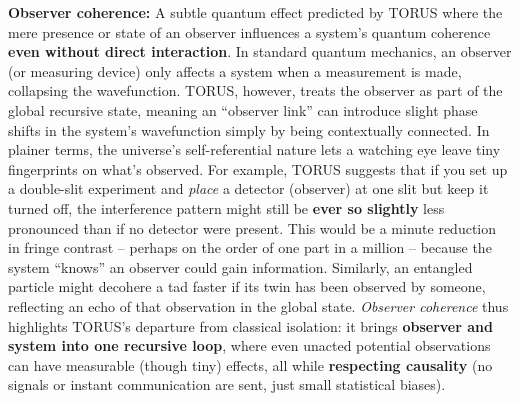 \documentclass[
]{article}
\begin{document}
{\textbf{Observer coherence:} A subtle quantum effect predicted by TORUS
where the mere presence or state of an observer influences a system's
quantum coherence \textbf{even without direct interaction}\hspace{0pt}.
In standard quantum mechanics, an observer (or measuring device) only
affects a system when a measurement is made, collapsing the
wavefunction. TORUS, however, treats the observer as part of the global
recursive state, meaning an ``observer link'' can introduce slight phase
shifts in the system's wavefunction simply by being contextually
connected\hspace{0pt}. In plainer terms, the universe's self-referential
nature lets a watching eye leave tiny fingerprints on what's observed.
For example, TORUS suggests that if you set up a double-slit experiment
and \emph{place} a detector (observer) at one slit but keep it turned
off, the interference pattern might still be \textbf{ever so slightly}
less pronounced than if no detector were present\hspace{0pt}. This would
be a minute reduction in fringe contrast -- perhaps on the order of one
part in a million -- because the system ``knows'' an observer could gain
information\hspace{0pt}. Similarly, an entangled particle might decohere
a tad faster if its twin has been observed by someone, reflecting an
echo of that observation in the global state. \emph{Observer coherence}
thus highlights TORUS's departure from classical isolation: it brings
\textbf{observer and system into one recursive loop}, where even unacted
potential observations can have measurable (though tiny) effects, all
while \textbf{respecting causality} (no signals or instant communication
are sent, just small statistical biases).

}
\end{document}
